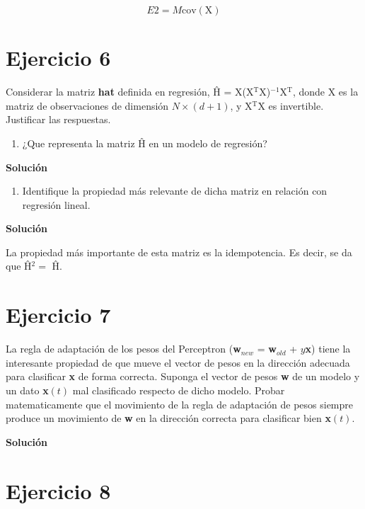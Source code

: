 \documentclass[11pt,a4paper]{article}
\newcommand{\answer}{\noindent\textbf{Solución}}
\newcommand{\cov}{\text{cov}}
\begin{document}
\begin{equation}
	E2 = M \cov(\text{X})
\end{equation}

\section*{Ejercicio 6}

\noindent Considerar la matriz \textbf{hat} definida en regresión, Ĥ = X(X$^\text{T}$X)$^{-1}$X$^\text{T}$, donde X es la
matriz de observaciones de dimensión $N \times (d + 1)$, y X$^\text{T}$X es invertible. Justificar las respuestas.

\begin{enumerate}[label=\textit{\alph*})]
	\item ¿Que representa la matriz Ĥ en un modelo de regresión?
\end{enumerate}

\answer

\begin{enumerate}[resume,label=\textit{\alph*})]
	\item Identifique la propiedad más relevante de dicha matriz en relación con regresión lineal.
\end{enumerate}

\answer

La propiedad más importante de esta matriz es la idempotencia. Es decir, se da que Ĥ$^2 = $ Ĥ.

\section*{Ejercicio 7}

\noindent La regla de adaptación de los pesos del Perceptron (\textbf{w}$_{new}$ = \textbf{w}$_{old}$ + $y$\textbf{x}) tiene
la interesante propiedad de que mueve el vector de pesos en la dirección adecuada para clasificar \textbf{x} de forma
correcta. Suponga el vector de pesos \textbf{w} de un modelo y un dato \textbf{x}$(t)$ mal clasificado respecto de dicho
modelo. Probar matematicamente que el movimiento de la regla de adaptación de pesos siempre produce un movimiento de
\textbf{w} en la dirección correcta para clasificar bien \textbf{x}$(t)$.

\answer




\section*{Ejercicio 8}
\end{document}
